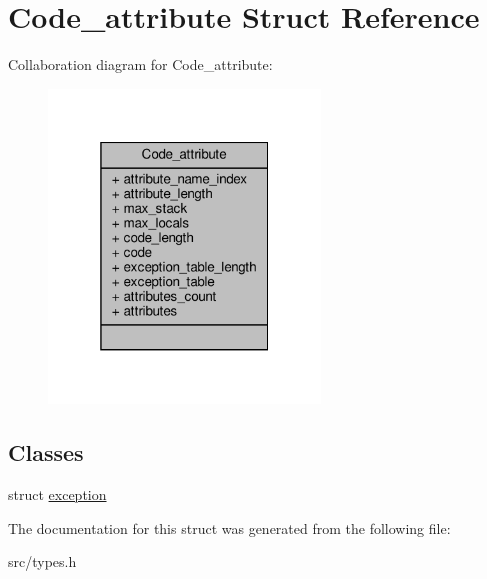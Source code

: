 \hypertarget{structCode__attribute}{}\section{Code\+\_\+attribute Struct Reference}
\label{structCode__attribute}


Collaboration diagram for Code\+\_\+attribute\+:\nopagebreak
\begin{figure}[H]
\begin{center}
\leavevmode
\includegraphics[width=205pt]{structCode__attribute__coll__graph}
\end{center}
\end{figure}
\subsection*{Classes}
\begin{DoxyCompactItemize}
\item 
struct \hyperlink{structCode__attribute_1_1exception}{exception}
\end{DoxyCompactItemize}


The documentation for this struct was generated from the following file\+:\begin{DoxyCompactItemize}
\item 
src/types.\+h\end{DoxyCompactItemize}
